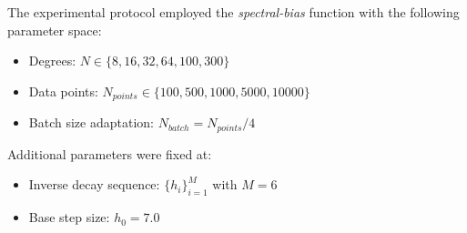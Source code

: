 The experimental protocol employed the \textit{spectral-bias} function with the following parameter space:
\begin{itemize}
    \item Degrees: $N \in \{8,16,32,64,100,300\}$
    \item Data points: $N_{points} \in \{100,500,1000,5000,10000\}$
    \item Batch size adaptation: $N_{batch}=N_{points}/4$
\end{itemize}

Additional parameters were fixed at:
\begin{itemize}
    \item Inverse decay sequence: $\{h_i\}_{i=1}^M$ with $M=6$
    \item Base step size: $h_0=7.0$
\end{itemize}

